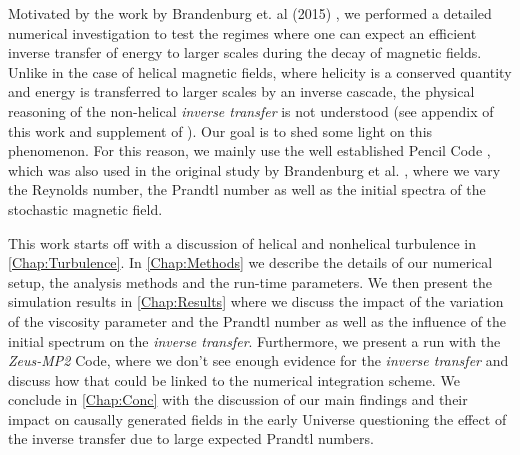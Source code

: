 Motivated by the work by Brandenburg et. al (2015) \cite{Brandenburg15},
we performed a detailed numerical investigation to test the regimes where one can
expect an efficient inverse transfer of energy to larger scales during
the decay of magnetic fields.
Unlike in the case of helical magnetic fields, where helicity is a
conserved quantity and energy is transferred to larger scales by an
inverse cascade, the physical reasoning of the non-helical
\textit{inverse transfer} is not understood (see appendix of this work
and supplement of \cite{Brandenburg15}). Our goal is to shed some light on
this phenomenon. For this reason, we mainly use the well established
Pencil Code \cite{PENCIL10}, which was also used in the original study
by Brandenburg et al. \cite{Brandenburg15}, where we vary the
Reynolds number, the Prandtl number as well as the initial spectra of
the stochastic magnetic field. 


This work starts off with a discussion of helical and nonhelical
turbulence in \cref{Chap:Turbulence}.  In \cref{Chap:Methods} we
describe the details of our numerical setup, the analysis methods and
the run-time parameters. We then present the simulation results in
\cref{Chap:Results} where we discuss the impact of the variation of
the viscosity parameter and the Prandtl number as well as the
influence of the initial spectrum on the \textit{inverse transfer}.
Furthermore, we present a run with the \textit{Zeus-MP2} Code, where
we don't see enough evidence for the \textit{inverse transfer} and
discuss how that could be linked to the numerical integration
scheme. We conclude in \cref{Chap:Conc} with the discussion
of our main findings and their impact on causally generated fields in
the early Universe questioning the effect of the inverse transfer due
to large expected Prandtl numbers. 
% 
% 
% 
% 
% 
% 
% 
%
